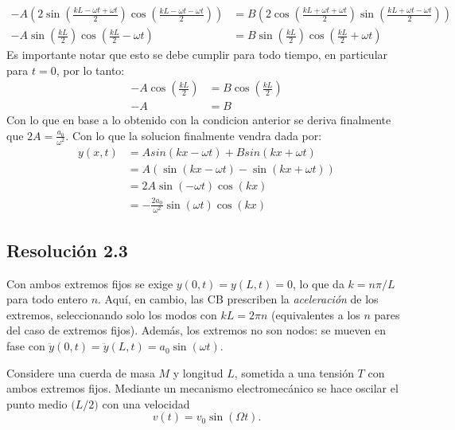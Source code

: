 \documentclass[
  11pt,
  letterpaper,
   addpoints,
   answers
  ]{exam}
\begin{document}
\begin{questions}
\begin{solution}
  \begin{align}
    -A\left(2\sin\left(\frac{kL-\omega t+\omega t}{2}\right)\cos\left(\frac{kL-\omega t-\omega t}{2}\right)\right) &= B\left(2\cos\left(\frac{kL+\omega t+\omega t}{2}\right)\sin\left(\frac{kL+\omega t-\omega t}{2}\right)\right) \\
    -A\sin\left(\frac{kL}{2}\right)\cos\left(\frac{kL}{2} - \omega t\right) &= B\sin\left(\frac{kL}{2}\right)\cos\left(\frac{kL}{2} + \omega t\right)
  \end{align}
  Es importante notar que esto se debe cumplir para todo tiempo, en particular para $t=0$, por lo tanto:
  \begin{align}
    -A\cos\left(\frac{kL}{2}\right) &= B\cos\left(\frac{kL}{2}\right)\\
    -A &= B
  \end{align}
  Con lo que en base a lo obtenido con la condicion anterior se deriva finalmente que $2A = \frac{a_{0}}{\omega^2}$. Con lo que la solucion finalmente vendra dada por:
\begin{align}
  y(x,t) &= Asin(kx - \omega t) + Bsin(kx + \omega t)\\
  &= A\left(\sin(kx - \omega t) - \sin(kx + \omega t)\right)\\
  &= 2A\sin(-\omega t )\cos(kx)\\
  &= - \frac{2a_{0}}{\omega^2}\sin(\omega t)\cos(kx)
\end{align}
  \subsection*{Resolución 2.3}
  Con ambos extremos fijos se exige $y(0,t)=y(L,t)=0$, lo que da $k=n\pi/L$ para todo entero $n$. Aquí, en cambio, las CB prescriben la \emph{aceleración} de los extremos, seleccionando solo los modos con $kL=2\pi n$ (equivalentes a los $n$ pares del caso de extremos fijos). Además, los extremos no son nodos: se mueven en fase con $\ddot y(0,t)=\ddot y(L,t)=a_0\sin(\omega t)$.
\end{solution}
\question  Considere una cuerda de masa $M$ y longitud $L$, sometida a una tensión $T$ con ambos extremos fijos. Mediante un mecanismo electromecánico se hace oscilar el punto medio $\big(L/2\big)$ con una velocidad
\begin{equation}
  v(t)=v_0\sin(\Omega t).
\end{equation}

\begin{figure}[h!]
\centering
{}
\end{figure}
\end{questions}
\end{document}
